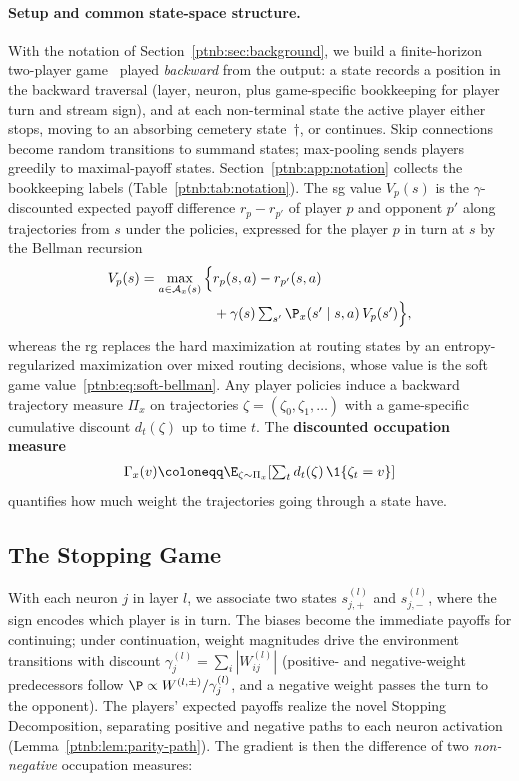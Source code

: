 \paragraph{Setup and common state-space structure.}
With the notation of Section~\ref{ptnb:sec:background}, we build a finite-horizon two-player
game~\parencite{OsborneRubinstein1994} played \emph{backward} from the output: a state records a
position in the backward traversal (layer, neuron, plus game-specific bookkeeping for player turn
and stream sign), and at each non-terminal state the active player either stops, moving to an
absorbing cemetery state~$\dagger$, or continues. Skip connections become random transitions to
summand states; max-pooling sends players greedily to maximal-payoff states.
Section~\ref{ptnb:app:notation} collects the bookkeeping labels (Table~\ref{ptnb:tab:notation}).
The \ac{sg} value $V_p(s)$ is the $\gamma$-discounted expected payoff difference $r_p - r_{p'}$ of
player $p$ and opponent $p'$ along trajectories from $s$ under the policies, expressed for the
player $p$ in turn at $s$ by the Bellman recursion
\begin{align}\label{ptnb:eq:bellman}
    V_p(s) = \max_{a \in \mathcal{A}_x(s)} \Big\{ &r_p(s,a) - r_{p'}(s,a) \nonumber\\
    &+ \gamma(s) \textstyle\sum_{s'} \P_x(s' \mid s,a)\, V_p(s') \Big\},
\end{align}
whereas the \acl{rg} replaces the hard maximization at routing states by an entropy-regularized
maximization over mixed routing decisions, whose value is the soft game
value~\eqref{ptnb:eq:soft-bellman}.
Any player policies induce a backward trajectory measure $\Pi_x$ on trajectories $\zeta=(\zeta_0,
    \zeta_1, \dots)$ with a game-specific cumulative discount $d_t(\zeta)$ up to time $t$.
The \textbf{discounted occupation measure}~\parencite{Puterman1994mdp}
\begin{align}\label{ptnb:eq:attribution}
    \Gamma_x(v) \coloneqq \E_{\zeta \sim \Pi_x}\!\left[ \textstyle\sum_t d_t(\zeta)\,\1\{\zeta_t = v\}
    \right]
\end{align}
quantifies how much weight the trajectories going through a state have.

\subsection{The Stopping Game}\label{ptnb:sec:stopping}\label{sec:stopping_game_reinterpretation}

With each neuron $j$ in layer $l$, we associate two states $s^{(l)}_{j,+}$ and $s^{(l)}_{j,-}$,
where the sign encodes which player is in turn.
The biases become the immediate payoffs for continuing; under continuation, weight magnitudes drive
the environment transitions with discount $\gamma_j^{(l)} = \sum_i |W_{ij}^{(l)}|$ (positive- and
negative-weight predecessors follow $\P \propto W^{(l,\pm)}/\gamma^{(l)}_j$, and a negative weight
passes the turn to the opponent).
The players' expected payoffs realize the novel Stopping Decomposition, separating positive and
negative paths to each neuron activation (Lemma~\ref{ptnb:lem:parity-path}). The gradient is then the
difference of two \emph{non-negative} occupation measures:

